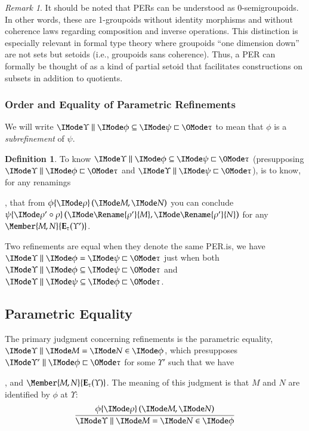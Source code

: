 \documentclass[11pt]{article}
\theoremstyle{definition}
\newtheorem{definition}[thm]{Definition}
\theoremstyle{notation}
\theoremstyle{remark}
\newtheorem{remark}[thm]{Remark}
\numberwithin{equation}{section}
\newcommand\Exprs{\mathbf{E}}
\begin{document}
\begin{remark}
  It should be noted that PERs can be understood as 0-semigroupoids. In other
  words, these are 1-groupoids without identity morphisms and without coherence
  laws regarding composition and inverse operations. This distinction is
  especially relevant in formal type theory where groupoids ``one dimension
  down'' are not sets but setoids (i.e., groupoids sans coherence). Thus, a PER
  can formally be thought of as a kind of partial setoid that facilitates
  constructions on subsets in addition to quotients. 

\end{remark}

\subsubsection{Order and Equality of Parametric Refinements}

We will write $\IsSubrefinement{\Upsilon}{\phi}{\psi}{\tau}$ to mean that $\phi$ is
a \emph{subrefinement} of $\psi$.

\begin{definition}

  To know $\IsSubrefinement{\Upsilon}{\phi}{\psi}{\tau}$ (presupposing
  $\Refines{\Upsilon}{\phi}{\tau}$ and $\Refines{\Upsilon}{\psi}{\tau}$), is
  to know, for any renamings
  , that from $\RefEquate{\phi}{\rho}{M}{N}$ you can conclude
  $\RefEquate{\psi}{\rho'\circ\rho}{\Rename{\rho'}{M}}{\Rename{\rho'}{N}}$ for any
  $\Member{M,N}{\Exprs_\tau(\Upsilon')}$.

\end{definition}

Two refinements are equal when they denote the same PER.\@That is, we have
$\EqRefines{\Upsilon}{\phi}{\psi}{\tau}$ just when both
$\IsSubrefinement{\Upsilon}{\phi}{\psi}{\tau}$ and
$\IsSubrefinement{\Upsilon}{\psi}{\phi}{\tau}$.

\subsection{Parametric Equality}

The primary judgment concerning refinements is the parametric equality,
$\RMemEq{\Upsilon}{M}{N}{\phi}$, which presupposes
$\Refines{\Upsilon'}{\phi}{\tau}$ for some $\Upsilon'$ such that we have
, and $\Member{M,N}{\Exprs_\tau(\Upsilon)}$. The meaning of this judgment is
that $M$ and $N$ are identified by $\phi$ at $\Upsilon$:
\[
  \infer{
    \RMemEq{\Upsilon}{M}{N}{\phi}
  }{
    \RefEquate{\phi}{\rho}{M}{N}
  }
\]
\end{document}
